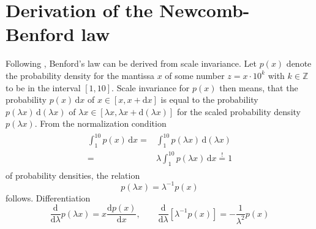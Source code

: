\documentclass[a4paper,10pt, twocolumn]{article}
\begin{document}
\section{Derivation of the Newcomb-Benford law}
Following \cite{Burgos2021}, Benford's law can be derived from scale invariance. Let $p(x)$ denote the probability density for the mantissa $x$ of some number $z = x\cdot 10^k$ with $k \in \mathbb{Z}$ to be in the interval $[1,10]$. Scale invariance for $p(x)$ then means, that the probability $p(x)\,\mathrm{d}x$ of $x \in [x, x+\mathrm{d}x]$ is equal to the probability $p(\lambda x)\,\mathrm{d}(\lambda x)$ of $\lambda x \in [\lambda x, \lambda x + \mathrm{d}(\lambda x)]$ for the scaled probability density $p(\lambda x)$. From the normalization condition \begin{align}\begin{aligned}\label{eq:normalizationcondition}
	\int_{1}^{10} p(x)\,\mathrm{d}x =& \int_{1}^{10} p(\lambda x)\,\mathrm{d}(\lambda x) \\ =& \lambda \int_{1}^{10} p(\lambda x)\,\mathrm{d}x \overset{!}{=} 1
	\end{aligned}\end{align}
of probability densities, the relation \begin{equation}
	p(\lambda x) = \lambda^{-1}p(x)
\end{equation} follows. Differentiation \begin{equation}
\frac{\mathrm{d}}{\mathrm{d}\lambda} p(\lambda x) = x\frac{\mathrm{d}p(x)}{\mathrm{d}x}, \qquad \frac{\mathrm{d}}{\mathrm{d}\lambda}[\lambda^{-1}p(x)] = -\frac{1}{\lambda^2}p(x)
\end{equation}
\end{document}

